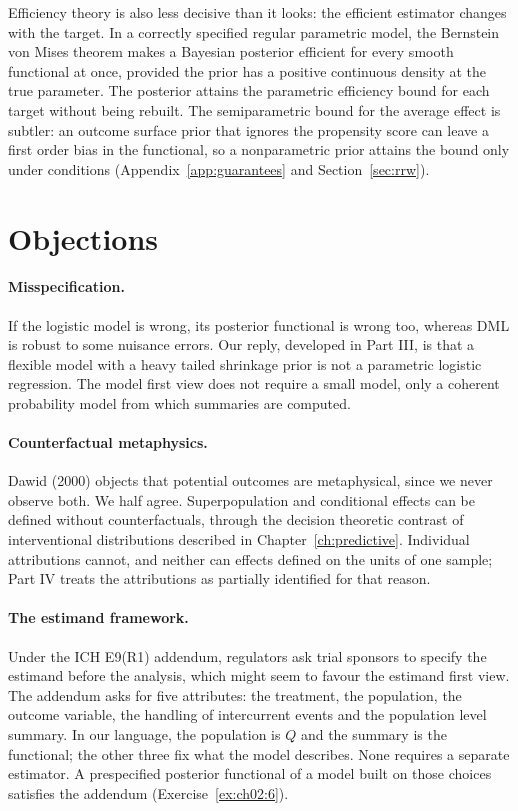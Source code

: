 Efficiency theory is also less decisive than it looks: the efficient estimator changes with the target. In a correctly specified regular parametric model, the Bernstein von Mises theorem makes a Bayesian posterior efficient for every smooth functional at once, provided the prior has a positive continuous density at the true parameter. The posterior attains the parametric efficiency bound for each target without being rebuilt. The semiparametric bound for the average effect is subtler: an outcome surface prior that ignores the propensity score can leave a first order bias in the functional, so a nonparametric prior attains the bound only under conditions (Appendix~\ref{app:guarantees} and Section~\ref{sec:rrw}).

\section{Objections}

\paragraph{Misspecification.} If the logistic model is wrong, its posterior functional is wrong too, whereas DML is robust to some nuisance errors. Our reply, developed in Part III, is that a flexible model with a heavy tailed shrinkage prior is not a parametric logistic regression. The model first view does not require a small model, only a coherent probability model from which summaries are computed.

\paragraph{Counterfactual metaphysics.} Dawid (2000) objects that potential outcomes are metaphysical, since we never observe both. We half agree. Superpopulation and conditional effects can be defined without counterfactuals, through the decision theoretic contrast of interventional distributions described in Chapter~\ref{ch:predictive}. Individual attributions cannot, and neither can effects defined on the units of one sample; Part IV treats the attributions as partially identified for that reason.

\paragraph{The estimand framework.} Under the ICH E9(R1) addendum, regulators ask trial sponsors to specify the estimand before the analysis, which might seem to favour the estimand first view. The addendum asks for five attributes: the treatment, the population, the outcome variable, the handling of intercurrent events and the population level summary. In our language, the population is $Q$ and the summary is the functional; the other three fix what the model describes. None requires a separate estimator. A prespecified posterior functional of a model built on those choices satisfies the addendum (Exercise~\ref{ex:ch02:6}).

